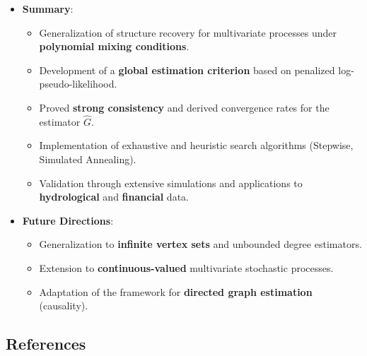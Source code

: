 \documentclass[
  english,
  letterpaper,
  DIV=11,
  numbers=noendperiod]{scrartcl}
\providecommand{\tightlist}{%
  \setlength{\itemsep}{0pt}\setlength{\parskip}{0pt}}
\begin{document}
\begin{itemize}
\tightlist
\item
  \textbf{Summary}:

  \begin{itemize}
  \tightlist
  \item
    Generalization of structure recovery for multivariate processes
    under \textbf{polynomial mixing conditions}.
  \item
    Development of a \textbf{global estimation criterion} based on
    penalized log-pseudo-likelihood.
  \item
    Proved \textbf{strong consistency} and derived convergence rates for
    the estimator \(\widehat{G}\).
  \item
    Implementation of exhaustive and heuristic search algorithms
    (Stepwise, Simulated Annealing).
  \item
    Validation through extensive simulations and applications to
    \textbf{hydrological} and \textbf{financial} data.
  \end{itemize}
\item
  \textbf{Future Directions}:

  \begin{itemize}
  \tightlist
  \item
    Generalization to \textbf{infinite vertex sets} and unbounded degree
    estimators.
  \item
    Extension to \textbf{continuous-valued} multivariate stochastic
    processes.
  \item
    Adaptation of the framework for \textbf{directed graph estimation}
    (causality).
  \end{itemize}
\end{itemize}

\subsection{References}\label{references}
\end{document}
